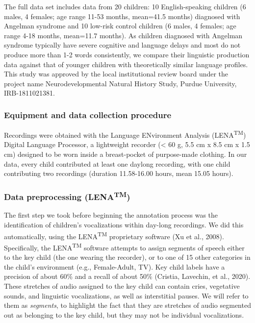 \documentclass[english,,man]{apa6}
\begin{document}
The full data set includes data from 20 children: 10 English-speaking children (6 males, 4 females; age range 11-53 months, mean=41.5 months) diagnosed with Angelman syndrome and 10 low-risk control children (6 males, 4 females; age range 4-18 months, mean=11.7 months). As children diagnosed with Angelman syndrome typically have severe cognitive and language delays and most do not produce more than 1-2 words consistently, we compare their linguistic production data against that of younger children with theoretically similar language profiles. This study was approved by the local institutional review board under the project name Neurodevelopmental Natural History Study, Purdue University, IRB-1811021381.

\hypertarget{equipment-and-data-collection-procedure}{%
\subsubsection{Equipment and data collection procedure}\label{equipment-and-data-collection-procedure}}

Recordings were obtained with the Language ENvironment Analysis (LENA\textsuperscript{TM}) Digital Language Processor, a lightweight recorder (\textless{} 60 g, 5.5 cm x 8.5 cm x 1.5 cm) designed to be worn inside a breast-pocket of purpose-made clothing. In our data, every child contributed at least one daylong recording, with one child contributing two recordings (duration 11.58-16.00 hours, mean 15.05 hours).

\hypertarget{data-preprocessing-lenatm}{%
\subsubsection{\texorpdfstring{Data preprocessing (LENA\textsuperscript{TM})}{Data preprocessing (LENATM)}}\label{data-preprocessing-lenatm}}

The first step we took before beginning the annotation process was the identification of children's vocalizations within day-long recordings. We did this automatically, using the LENA\textsuperscript{TM} proprietary software (Xu et al., 2008). Specifically, the LENA\textsuperscript{TM} software attempts to assign segments of speech either to the key child (the one wearing the recorder), or to one of 15 other categories in the child's environment (e.g., Female-Adult, TV). Key child labels have a precision of about 60\% and a recall of about 50\% (Cristia, Lavechin, et al., 2020). These stretches of audio assigned to the key child can contain cries, vegetative sounds, and linguistic vocalizations, as well as interstitial pauses. We will refer to them as \emph{segments}, to highlight the fact that they are stretches of audio segmented out as belonging to the key child, but they may not be individual vocalizations.
\end{document}
